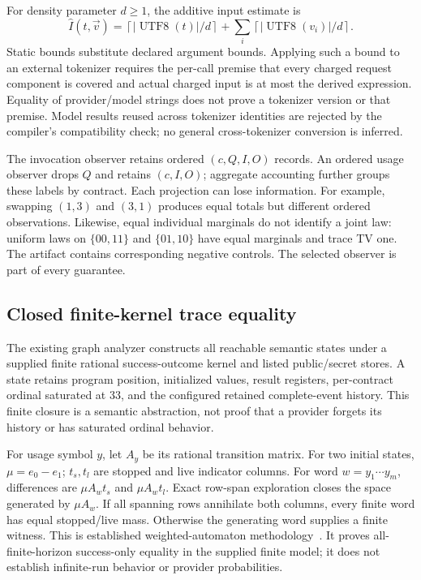 \documentclass[11pt,a4paper]{article}
\begin{document}
For density parameter $d\geq1$, the additive input estimate is
\[
\widehat I(t,\vec v)=\left\lceil|\operatorname{UTF8}(t)|/d\right\rceil+
\sum_i\left\lceil|\operatorname{UTF8}(v_i)|/d\right\rceil.
\]
Static bounds substitute declared argument bounds. Applying such a bound to an external tokenizer requires the per-call premise that every charged request component is covered and actual charged input is at most the derived expression. Equality of provider/model strings does not prove a tokenizer version or that premise. Model results reused across tokenizer identities are rejected by the compiler's compatibility check; no general cross-tokenizer conversion is inferred.

The invocation observer retains ordered $(c,Q,I,O)$ records. An ordered usage observer drops $Q$ and retains $(c,I,O)$; aggregate accounting further groups these labels by contract. Each projection can lose information. For example, swapping $(1,3)$ and $(3,1)$ produces equal totals but different ordered observations. Likewise, equal individual marginals do not identify a joint law: uniform laws on $\{00,11\}$ and $\{01,10\}$ have equal marginals and trace TV one. The artifact contains corresponding negative controls. The selected observer is part of every guarantee.

\subsection{Closed finite-kernel trace equality}
The existing graph analyzer constructs all reachable semantic states under a supplied finite rational success-outcome kernel and listed public/secret stores. A state retains program position, initialized values, result registers, per-contract ordinal saturated at 33, and the configured retained complete-event history. This finite closure is a semantic abstraction, not proof that a provider forgets its history or has saturated ordinal behavior.

For usage symbol $y$, let $A_y$ be its rational transition matrix. For two initial states, $\mu=e_0-e_1$; $t_s,t_l$ are stopped and live indicator columns. For word $w=y_1\cdots y_m$, differences are $\mu A_wt_s$ and $\mu A_wt_l$. Exact row-span exploration closes the space generated by $\mu A_w$. If all spanning rows annihilate both columns, every finite word has equal stopped/live mass. Otherwise the generating word supplies a finite witness. This is established weighted-automaton methodology~\cite{tzeng,kiefer,weighted}. It proves all-finite-horizon success-only equality in the supplied finite model; it does not establish infinite-run behavior or provider probabilities.
\end{document}
